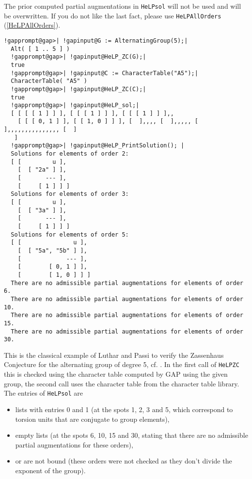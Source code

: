 \documentclass[a4paper,11pt]{report}
\begin{document}
{{{ The prior computed partial augmentations in \texttt{HeLP{\textunderscore}sol} will not be used and will be overwritten. If you do not like the last fact,
please use \texttt{HeLP{\textunderscore}AllOrders} (\ref{HeLPAllOrders}). }

 
\begin{Verbatim}[commandchars=!@|,fontsize=\small,frame=single,label=Example]
  !gapprompt@gap>| !gapinput@G := AlternatingGroup(5);|
  Alt( [ 1 .. 5 ] )
  !gapprompt@gap>| !gapinput@HeLP_ZC(G);|
  true
  !gapprompt@gap>| !gapinput@C := CharacterTable("A5");|
  CharacterTable( "A5" )
  !gapprompt@gap>| !gapinput@HeLP_ZC(C);|
  true
  !gapprompt@gap>| !gapinput@HeLP_sol;|
  [ [ [ [ 1 ] ] ], [ [ [ 1 ] ] ], [ [ [ 1 ] ] ],, 
    [ [ [ 0, 1 ] ], [ [ 1, 0 ] ] ], [  ],,,, [  ],,,,, [  ],,,,,,,,,,,,,,, [  ] 
   ]
  !gapprompt@gap>| !gapinput@HeLP_PrintSolution(); |
  Solutions for elements of order 2:
  [ [         u ],
    [  [ "2a" ] ],
    [       --- ],
    [     [ 1 ] ] ]
  Solutions for elements of order 3:
  [ [         u ],
    [  [ "3a" ] ],
    [       --- ],
    [     [ 1 ] ] ]
  Solutions for elements of order 5:
  [ [               u ],
    [  [ "5a", "5b" ] ],
    [             --- ],
    [        [ 0, 1 ] ],
    [        [ 1, 0 ] ] ]
  There are no admissible partial augmentations for elements of order 6.
  There are no admissible partial augmentations for elements of order 10.
  There are no admissible partial augmentations for elements of order 15.
  There are no admissible partial augmentations for elements of order 30.
\end{Verbatim}
 This is the classical example of Luthar and Passi to verify the Zassenhaus
Conjecture for the alternating group of degree 5, cf. \cite{LP}. In the first call of \texttt{HeLP{\textunderscore}ZC} this is checked using the character table computed by GAP using the given
group, the second call uses the character table from the character table
library. The entries of \texttt{HeLP{\textunderscore}sol} are 
\begin{itemize}
\item  lists with entries 0 and 1 (at the spots 1, 2, 3 and 5, which correspond to
torsion units that are conjugate to group elements), 
\item  empty lists (at the spots 6, 10, 15 and 30, stating that there are no
admissible partial augmentations for these orders), 
\item  or are not bound (these orders were not checked as they don't divide the
exponent of the group). 
\end{itemize}
}}
\end{document}
